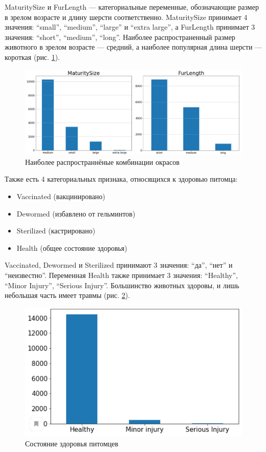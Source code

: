 \documentclass[14pt]{mmcs_article}
\begin{document}
MaturitySize и FurLength --- категориальные переменные, обозначающие размер в зрелом возрасте и длину шерсти соответственно. MaturitySize принимает 4 значения: ``small'', ``medium'', ``large'' и ``extra large'', а FurLength принимает 3 значения: ``short'', ``medium'', ``long''. Наиболее распространенный размер животного в зрелом возрасте --- средний, а наиболее популярная длина шерсти --- короткая (рис. \ref{analyse:sizelength}).

\begin{figure}[H]
	\centering
	\includegraphics[scale=0.4]{sizelength.png}
	\caption{Наиболее распространнёные комбинации окрасов}\label{analyse:sizelength}
\end{figure}

Также есть 4 категориальных признака, относящихся к здоровью питомца: 

\begin{itemize}
	\item Vaccinated (вакцинировано)
	\item Dewormed (избавлено от гельминтов)
	\item Sterilized (кастрировано)
	\item Health (общее состояние здоровья)
\end{itemize}

Vaccinated, Dewormed и Sterilized принимают 3 значения: ``да'', ``нет'' и ``неизвестно''. Переменная Health также принимает 3 значения: ``Healthy'', ``Minor Injury'', ``Serious Injury''. Большинство животных здоровы, и лишь небольшая часть имеет травмы (рис. \ref{analyse:health}).

\begin{figure}[H]
	\centering
	\includegraphics[scale=0.9]{health.png}
	\caption{Состояние здоровья питомцев}\label{analyse:health}
\end{figure}
\end{document}
